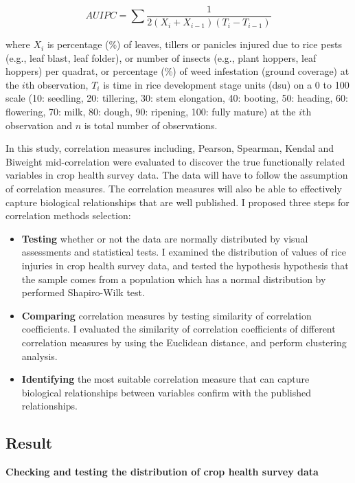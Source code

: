\begin{equation}
AUIPC = \sum{\frac{1}{2(X_{i} + X_{i-1})(T_{i} - T_{i-1})}}
\end{equation}

where $X_i$ is percentage (\%) of leaves, tillers or panicles injured due to rice pests (e.g., leaf blast, leaf folder), or number of insects (e.g., plant hoppers, leaf hoppers) per quadrat, or percentage (\%) of weed infestation (ground coverage) at the $i$th observation, $T_i$ is time in rice development stage units (dsu) on a 0 to 100 scale (10: seedling, 20: tillering, 30: stem elongation, 40: booting, 50: heading, 60: flowering, 70: milk, 80: dough, 90: ripening, 100: fully mature) at the $i$th observation and $n$ is total number of observations.

In this study, correlation measures including, Pearson, Spearman, Kendal and Biweight mid-correlation \citep{Wilcox_2012_Introduction} were evaluated to discover the true functionally related variables in crop health survey data. The data will have to follow the assumption of correlation measures. The correlation measures will also be able to effectively capture biological relationships that are well published. I proposed three steps for correlation methods selection: 

\begin{itemize}
\item \textbf{Testing} whether or not the data are normally distributed by visual assessments and statistical tests. I examined the distribution of values of rice injuries in crop health survey data, and tested the hypothesis hypothesis that the sample comes from a population which has a normal distribution by performed Shapiro-Wilk test.
\item \textbf{Comparing} correlation measures by testing similarity of correlation coefficients. I evaluated the similarity of correlation coefficients of different correlation measures by using the Euclidean distance, and perform clustering analysis.
\item \textbf{Identifying} the most suitable correlation measure that can capture biological relationships between variables confirm with the published relationships.
\end{itemize}

\subsection*{Result}

\textbf{Checking and testing the distribution of crop health survey data}


